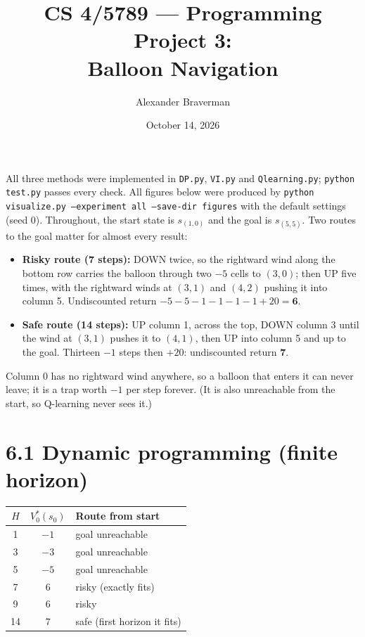 \documentclass[11pt,letterpaper]{article}
\title{CS 4/5789 --- Programming Project 3:\\Balloon Navigation}
\author{Alexander Braverman}
\date{October 14, 2026}
\begin{document}
\maketitle

All three methods were implemented in \texttt{DP.py}, \texttt{VI.py} and
\texttt{Qlearning.py}; \texttt{python test.py} passes every check. All
figures below were produced by
\texttt{python visualize.py --experiment all --save-dir figures} with the
default settings (seed 0). Throughout, the start state is $s_{(1,0)}$ and
the goal is $s_{(5,5)}$. Two routes to the goal matter for almost every
result:
\begin{itemize}[nosep]
  \item \textbf{Risky route (7 steps):} DOWN twice, so the rightward wind
    along the bottom row carries the balloon through two $-5$ cells to
    $(3,0)$; then UP five times, with the rightward winds at $(3,1)$ and
    $(4,2)$ pushing it into column 5. Undiscounted return
    $-5-5-1-1-1-1+20 = \mathbf{6}$.
  \item \textbf{Safe route (14 steps):} UP column 1, across the top, DOWN
    column 3 until the wind at $(3,1)$ pushes it to $(4,1)$, then UP into
    column 5 and up to the goal. Thirteen $-1$ steps then $+20$:
    undiscounted return $\mathbf{7}$.
\end{itemize}
Column 0 has no rightward wind anywhere, so a balloon that enters it can
never leave; it is a trap worth $-1$ per step forever. (It is also
unreachable from the start, so Q-learning never sees it.)

\section*{6.1 Dynamic programming (finite horizon)}

\begin{table}[H]
\centering
\begin{tabular}{ccl}
\toprule
$H$ & $V^*_0(s_0)$ & Route from start \\
\midrule
1  & $-1$ & goal unreachable \\
3  & $-3$ & goal unreachable \\
5  & $-5$ & goal unreachable \\
7  & $6$  & risky (exactly fits) \\
9  & $6$  & risky \\
14 & $7$  & safe (first horizon it fits) \\
\bottomrule
\end{tabular}
\end{table}
\end{document}

